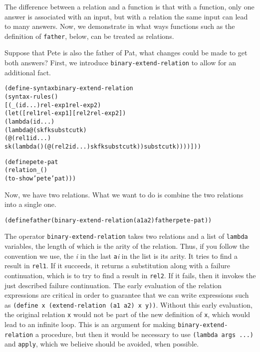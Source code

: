 The difference between a relation and a function is that with a
function, only one answer is associated with an input, but with a
relation the same input can lead to many answers.  Now, we demonstrate
in what ways functions such as the definition of \texttt{father},
below, can be treated as relations.

Suppose that Pete is also the father of Pat, what changes could be
made to get both answers?  First, we introduce
\texttt{binary-extend-relation} to allow for an additional fact.

\begin{alltt}
(define-syntax binary-extend-relation
  (syntax-rules ()
    [(_ (id ...) rel-exp1 rel-exp2)
     (let ([rel1 rel-exp1] [rel2 rel-exp2])
       (lambda (id ...)
         (lambda@ (sk fk subst cutk)
           (@ (rel1 id ...)
             sk (lambda () (@ (rel2 id ...) sk fk subst cutk)) subst cutk))))]))
\end{alltt}

\begin{alltt}
(define pete-pat
  (relation _ ()
    (to-show 'pete 'pat)))
\end{alltt}

Now, we have two relations.  What we want to do is combine the two
relations into a single one.  

\begin{alltt}
(define father (binary-extend-relation (a1 a2) father pete-pat))
\end{alltt}

The operator \texttt{binary-extend-relation} takes two relations and a
list of \texttt{lambda} variables, the length of which is the arity of
the relation.  Thus, if you follow the convention we use, the \emph{i}
in the last \texttt{a}\emph{i} in the list is its arity.  It tries to
find a result in \texttt{rel1}.  If it succeeds, it returns a
substitution along with a failure continuation, which is to try to
find a result in \texttt{rel2}.  If it fails, then it invokes the just
described failure continuation.  The early evaluation of the relation
expressions are critical in order to guarantee that we can write
expressions such as \texttt{(define x (extend-relation (a1 a2) x y))}.
Without this early evaluation, the original relation \texttt{x} would
not be part of the new definition of \texttt{x}, which would lead to
an infinite loop.  This is an argument for making
\texttt{binary-extend-relation} a procedure, but then it would be
necessary to use \texttt{(lambda args ...)} and \texttt{apply}, which
we belieive should be avoided, when possible.

